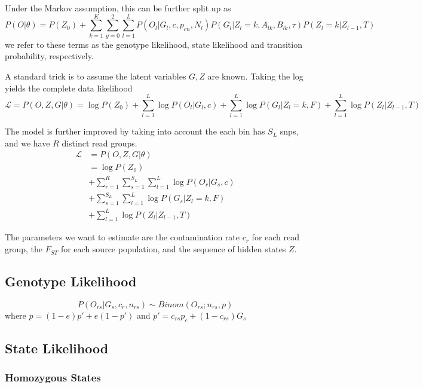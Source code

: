 \documentclass[10pt,a4paper]{article}
\begin{document}
Under the Markov assumption, this can be further split up as
$$P(O | \theta) = P(Z_0) +
\sum_{k=1}^K \sum_{g=0}^2 \sum_{l=1}^L 
P(O_l | G_l, c, p_{cn}, N_l)
P(G_l | Z_l = k, A_{lk}, B_{lk}, \tau)
P(Z_l = k |Z_{l-1}, T) $$
we refer to these terms as the genotype likelihood, state likelihood and transition probability, respectively.

A standard trick is to assume the latent variables $G, Z$ are known. Taking the log
yields the complete data likelihood
\begin{equation}
\mathcal{L}  = P(O, Z, G | \theta) = \log P(Z_0) 
+ \sum_{l=1}^L \log P(O_l | G_l, c)
+ \sum_{l=1}^L \log P(G_l | Z_l = k, F)
+ \sum_{l=1}^L  \log P(Z_l |Z_{l-1}, T) \label{eq:ll:simple}
\end{equation}

The model is further improved by taking into account the each bin has $S_L$ snps, and we have $R$ distinct read groups.
\begin{align}
\mathcal{L}  &= P(O, Z, G | \theta)  \nonumber\\
&=\log P(Z_0) \nonumber\\
&+ \sum_{r=1}^R\sum_{s=1}^{S_L}\sum_{l=1}^L \log P(O_r | G_s, c)\nonumber\\
&+ \sum_{s=1}^{S_L}\sum_{l=1}^L \log P(G_s | Z_l = k, F)\nonumber\\
&+ \sum_{l=1}^L  \log P(Z_l |Z_{l-1}, T) \label{eq:ll:correct}
\end{align}

The parameters we want to estimate are the contamination rate $c_r$ for each read group, the $F_{ST}$ for each source population, and the sequence of hidden states $Z$.

\subsection{Genotype Likelihood}
\begin{equation}
P(O_{rs}| G_s, c_r, n_{rs}) \sim Binom(O_{rs}; n_{rs}, p) \label{eq:ll:geno}
\end{equation}
where $p = (1-e) p' + e (1-p')$
and $p' =c_{rs} p_c + (1-c_{rs}) G_s$
\subsection{State Likelihood}
\subsubsection{Homozygous States}
\end{document}
